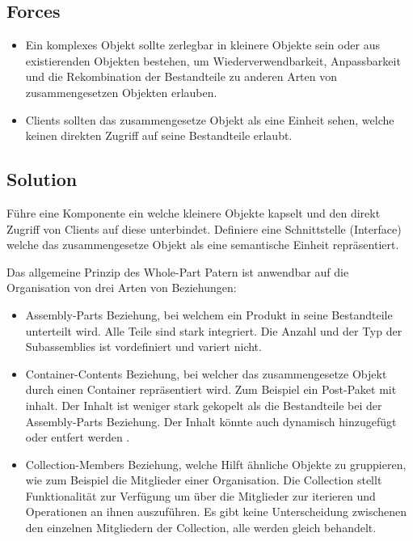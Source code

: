 \subsection*{Forces}


\begin{itemize}
	\item Ein komplexes Objekt sollte zerlegbar in kleinere Objekte sein oder aus existierenden Objekten bestehen, um Wiederverwendbarkeit, Anpassbarkeit und die Rekombination der Bestandteile zu anderen Arten von zusammengesetzen Objekten erlauben.
	\item Clients sollten das zusammengesetze Objekt als eine Einheit sehen, welche keinen direkten Zugriff auf seine Bestandteile erlaubt.
\end{itemize}

\subsection*{Solution}


Führe eine Komponente ein welche kleinere Objekte kapselt und den direkt Zugriff von Clients auf diese unterbindet. Definiere eine Schnittstelle (Interface) welche das zusammengesetze Objekt als eine semantische Einheit repräsentiert.

Das allgemeine Prinzip des Whole-Part Patern ist anwendbar auf die Organisation von drei Arten von Beziehungen:

\begin{itemize}
	\item Assembly-Parts Beziehung, bei welchem ein Produkt in seine Bestandteile unterteilt wird. Alle Teile sind stark integriert. Die Anzahl und der Typ der Subassemblies ist vordefiniert und variert nicht.
	\item Container-Contents Beziehung, bei welcher das zusammengesetze Objekt durch einen Container repräsentiert wird. Zum Beispiel ein Post-Paket mit inhalt. Der Inhalt ist weniger stark gekopelt als die Bestandteile bei der Assembly-Parts Beziehung. Der Inhalt könnte auch dynamisch hinzugefügt oder entfert werden .
	\item Collection-Members Beziehung, welche Hilft ähnliche Objekte zu gruppieren, wie zum Beispiel die Mitglieder einer Organisation. Die Collection stellt Funktionalität zur Verfügung um über die Mitglieder zur iterieren und Operationen an ihnen auszuführen. Es gibt keine Unterscheidung zwischenen den einzelnen Mitgliedern der Collection, alle werden gleich behandelt.
\end{itemize}

